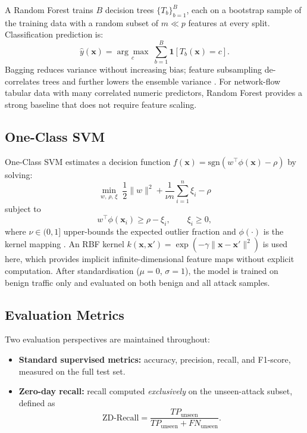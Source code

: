 \documentclass[10pt,conference]{IEEEtran}
\begin{document}
A Random Forest trains $B$ decision trees $\{T_b\}_{b=1}^{B}$, each on
a bootstrap sample of the training data with a random subset of
$m \ll p$ features at every split. Classification prediction is:
\begin{equation}
  \hat{y}(\mathbf{x}) = \underset{c}{\arg\max}\;\sum_{b=1}^{B}
  \mathbf{1}\!\left[T_b(\mathbf{x}) = c\right].
  \label{eq:rf}
\end{equation}
Bagging reduces variance without increasing bias; feature subsampling
de-correlates trees and further lowers the ensemble variance
\cite{breiman2001}. For network-flow tabular data with many correlated
numeric predictors, Random Forest provides a strong baseline that does
not require feature scaling.

\subsection{One-Class SVM}

One-Class SVM estimates a decision function $f(\mathbf{x}) = \text{sgn}
\!\left(w^\top\phi(\mathbf{x}) - \rho\right)$ by solving:
\begin{equation}
\min_{w,\,\rho,\,\xi}\;\frac{1}{2}\|w\|^2
  + \frac{1}{\nu n}\sum_{i=1}^{n}\xi_i - \rho
\label{eq:ocsvm-obj}
\end{equation}
subject to
\begin{equation}
w^\top\phi(\mathbf{x}_i) \ge \rho - \xi_i, \qquad \xi_i \ge 0,
\label{eq:ocsvm-cst}
\end{equation}
where $\nu \in (0,1]$ upper-bounds the expected outlier fraction and
$\phi(\cdot)$ is the kernel mapping \cite{scholkopf2001}. An RBF kernel
$k(\mathbf{x},\mathbf{x}') = \exp\!\left(-\gamma\|\mathbf{x}-\mathbf{x}'\|^2\right)$
is used here, which provides implicit infinite-dimensional feature
maps without explicit computation. After standardisation ($\mu=0$,
$\sigma=1$), the model is trained on benign traffic only and evaluated
on both benign and all attack samples.

\subsection{Evaluation Metrics}

Two evaluation perspectives are maintained throughout:

\begin{itemize}[leftmargin=*,noitemsep]
  \item \textbf{Standard supervised metrics:} accuracy, precision,
        recall, and F1-score, measured on the full test set.
  \item \textbf{Zero-day recall:} recall computed \emph{exclusively} on
        the unseen-attack subset, defined as
        \begin{equation}
          \text{ZD-Recall} = \frac{TP_{\text{unseen}}}{TP_{\text{unseen}} + FN_{\text{unseen}}}.
          \label{eq:zdrecall}
        \end{equation}
\end{itemize}
\end{document}
